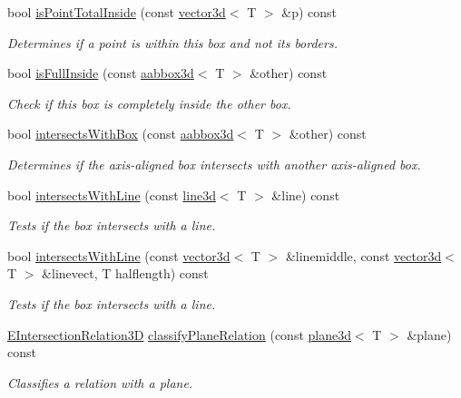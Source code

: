 \begin{DoxyCompactItemize}
bool \hyperlink{classirr_1_1core_1_1aabbox3d_a0be7a03228c7af1e6c563acea4af316e}{is\+Point\+Total\+Inside} (const \hyperlink{classirr_1_1core_1_1vector3d}{vector3d}$<$ T $>$ \&p) const
\begin{DoxyCompactList}\small\item\em Determines if a point is within this box and not its borders. \end{DoxyCompactList}\item 
bool \hyperlink{classirr_1_1core_1_1aabbox3d_a81be1b0ba25d5adff30182ce0f9670ab}{is\+Full\+Inside} (const \hyperlink{classirr_1_1core_1_1aabbox3d}{aabbox3d}$<$ T $>$ \&other) const
\begin{DoxyCompactList}\small\item\em Check if this box is completely inside the \textquotesingle{}other\textquotesingle{} box. \end{DoxyCompactList}\item 
bool \hyperlink{classirr_1_1core_1_1aabbox3d_a7210d8759855896ba4919a800ad69bbc}{intersects\+With\+Box} (const \hyperlink{classirr_1_1core_1_1aabbox3d}{aabbox3d}$<$ T $>$ \&other) const
\begin{DoxyCompactList}\small\item\em Determines if the axis-\/aligned box intersects with another axis-\/aligned box. \end{DoxyCompactList}\item 
bool \hyperlink{classirr_1_1core_1_1aabbox3d_ad0d7fec0145329dfca538066298fa3f2}{intersects\+With\+Line} (const \hyperlink{classirr_1_1core_1_1line3d}{line3d}$<$ T $>$ \&line) const
\begin{DoxyCompactList}\small\item\em Tests if the box intersects with a line. \end{DoxyCompactList}\item 
bool \hyperlink{classirr_1_1core_1_1aabbox3d_ad24417ef24e598bc484ea8b7af1c2187}{intersects\+With\+Line} (const \hyperlink{classirr_1_1core_1_1vector3d}{vector3d}$<$ T $>$ \&linemiddle, const \hyperlink{classirr_1_1core_1_1vector3d}{vector3d}$<$ T $>$ \&linevect, T halflength) const
\begin{DoxyCompactList}\small\item\em Tests if the box intersects with a line. \end{DoxyCompactList}\item 
\hyperlink{namespaceirr_1_1core_a8a9999eb0d151083f48afe5f7d17a96c}{E\+Intersection\+Relation3D} \hyperlink{classirr_1_1core_1_1aabbox3d_aa2a6c5613392e34552a31fe7b46286b1}{classify\+Plane\+Relation} (const \hyperlink{classirr_1_1core_1_1plane3d}{plane3d}$<$ T $>$ \&plane) const
\begin{DoxyCompactList}\small\item\em Classifies a relation with a plane. \end{DoxyCompactList}\end{DoxyCompactItemize}
